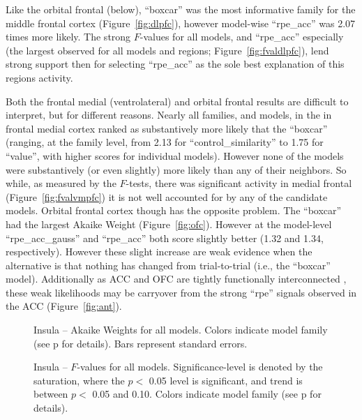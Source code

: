 \documentclass[doc,12pt]{apa}        %
\begin{document}
Like the orbital frontal (below), ``boxcar'' was the most informative family for the middle frontal cortex (Figure~\ref{fig:dlpfc}), however model-wise ``rpe\_acc'' was 2.07 times more likely.  The strong $F$-values for all models, and ``rpe\_acc'' especially (the largest observed for all models and regions; Figure~\ref{fig:fvaldlpfc}), lend strong support then for selecting ``rpe\_acc'' as the sole best explanation of this regions activity.

Both the frontal medial (ventrolateral) and orbital frontal results are difficult to interpret, but for different reasons.  Nearly all families, and models, in the in frontal medial cortex ranked as substantively more likely that the ``boxcar'' (ranging, at the family level, from 2.13 for ``control\_similarity'' to 1.75 for ``value'', with higher scores for individual models).  However none of the models were substantively (or even slightly) more likely than any of their neighbors.  So while, as measured by the $F$-tests, there was significant activity in medial frontal (Figure~\ref{fig:fvalvmpfc}) it is not well accounted for by any of the candidate models.  Orbital frontal cortex though has the opposite problem.  The ``boxcar'' had the largest Akaike Weight (Figure~\ref{fig:ofc}).  However at the model-level ``rpe\_acc\_gauss'' and ``rpe\_acc'' both score slightly better (1.32 and 1.34, respectively).  However these slight increase are weak evidence when the alternative is that nothing has changed from trial-to-trial (i.e., the ``boxcar'' model).  Additionally as ACC and OFC are tightly functionally interconnected \cite{Rudebeck:2008p4712}, these weak likelihoods may be carryover from the strong ``rpe'' signals observed in the ACC (Figure~\ref{fig:ant}).

\begin{figure}[tp]
    \centering
    \caption{Insula -- Akaike Weights for all models.  Colors indicate model family (see p\pageref{sub:cmb} for details). Bars represent standard errors.}
	\label{fig:insula}
\end{figure}
\begin{figure}[tp]
    \centering
    \caption{Insula -- $F$-values for all models.
    Significance-level is denoted by the saturation, where the $p <$ 0.05 level is
    significant, and trend is between $p <$ 0.05 and 0.10.  Colors indicate model family (see p\pageref{sub:cmb} for details).}
	\label{fig:fvalinsula}
\end{figure}
\end{document}
